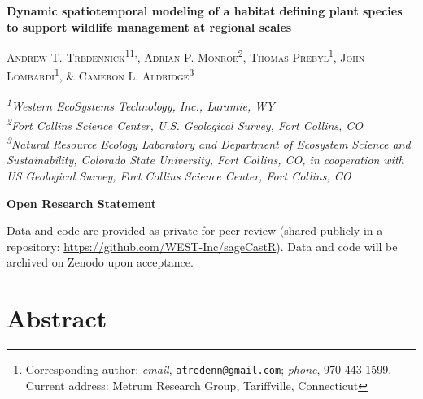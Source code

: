 \documentclass[
  12pt,
]{article}
\author{}
\date{\vspace{-2.5em}}
\begin{document}

\newcommand{\new}{\textcolor{blue}} 
\newcommand{\comm}{\textcolor{ForestGreen}}
\newcommand{\response}{\textcolor{blue}}
\newcommand{\reply}{\textcolor{blue}}
\renewcommand*{\thefootnote}{\fnsymbol{footnote}}

\begin{centering}
\textbf{\Large{Dynamic spatiotemporal modeling of a habitat defining plant species to support wildlife management at regional scales}}

\textsc{\small{Andrew T. Tredennick\footnote{Corresponding author: \textit{email}, \texttt{atredenn@gmail.com}; \textit{phone}, 970-443-1599. Current address: Metrum Research Group, Tariffville, Connecticut}\textsuperscript{1,}, Adrian P. Monroe\textsuperscript{2}, Thomas Prebyl\textsuperscript{1}, John Lombardi\textsuperscript{1}, \& Cameron L. Aldridge\textsuperscript{3}}}

\textit{\small{\textsuperscript{1}Western EcoSystems Technology, Inc., Laramie, WY}} \\
\textit{\small{\textsuperscript{2}Fort Collins Science Center, U.S. Geological Survey, Fort Collins, CO}} \\
\textit{\small{\textsuperscript{3}Natural Resource Ecology Laboratory and Department of Ecosystem Science and Sustainability, Colorado State University, Fort Collins, CO, in cooperation with US Geological Survey, Fort Collins Science Center, Fort Collins, CO}}

\end{centering}

\renewcommand*{\thefootnote}{\arabic{footnote}}
\setcounter{footnote}{0}

\bigskip{}

\noindent{}\textbf{Open Research Statement}

\noindent{}Data and code are provided as private-for-peer review (shared publicly in a repository: \url{https://github.com/WEST-Inc/sageCastR}). Data and code will be archived on Zenodo upon acceptance.

\newpage{}

\hypertarget{abstract}{%
\section{Abstract}\label{abstract}}
\end{document}
